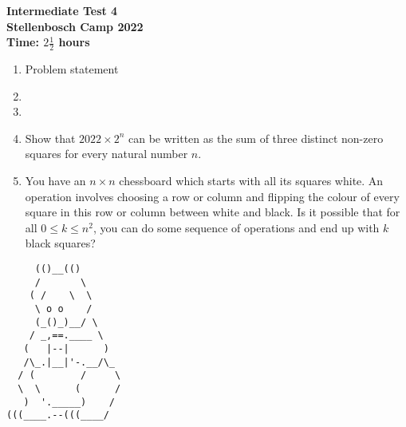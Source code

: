 \documentclass{article}
\begin{document}
\thispagestyle{empty}

\begin{center}
  \textbf{\Large Intermediate Test 4}
  \\ \vspace{1em}
  \textbf{\large Stellenbosch Camp 2022}
  \\ \vspace{1em}
  \textbf{\large Time: $2\frac{1}{2}$ hours}
\end{center}

\bigskip

\begin{enumerate}[itemsep=\fill]

\item %
Problem statement


\item %


\item %


\item %
Show that $2022 \times 2^n$ can be written as the sum of three distinct non-zero squares for every natural number $n$.


\item %
You have an $n \times n$ chessboard which starts with all its squares white.
An operation involves choosing a row or column and flipping the colour of every square in this row or column between white and black.
Is it possible that for all $0 \leq k \leq n^2$, you can do some sequence of operations and end up with $k$ black squares?

\end{enumerate}


\vfill
\centering
\small
\begin{BVerbatim}
     (()__(()
     /       \ 
    ( /    \  \
     \ o o    /
     (_()_)__/ \             
    / _,==.____ \
   (   |--|      )
   /\_.|__|'-.__/\_
  / (        /     \ 
  \  \      (      /
   )  '._____)    /    
(((____.--(((____/
\end{BVerbatim}
\end{document}
